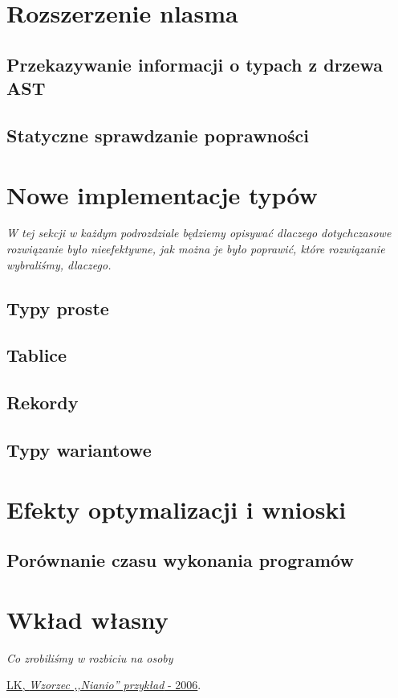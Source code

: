\documentclass[licencjacka]{pracamgr}
\begin{document}
\chapter{Rozszerzenie nlasma}
\section{Przekazywanie informacji o typach z drzewa AST}
\section{Statyczne sprawdzanie poprawności}

\chapter{Nowe implementacje typów}
  \emph{W tej sekcji w każdym podrozdziale będziemy opisywać dlaczego
    dotychczasowe rozwiązanie było nieefektywne, jak można je
    było poprawić, które rozwiązanie wybraliśmy, dlaczego.}
\section{Typy proste}
\section{Tablice}
\section{Rekordy}
\section{Typy wariantowe}

\chapter{Efekty optymalizacji i wnioski}
\section{Porównanie czasu wykonania programów}

\chapter{Wkład własny}
\emph{Co zrobiliśmy w rozbiciu na osoby}


\appendix

\begin{thebibliography}{99}

 \href{https://www.mimuw.edu.pl/~chrzaszc/BPJ20067/nianio.pdf}{LK, \textit{Wzorzec ,,Nianio'' przykład} - 2006}.

\end{thebibliography}
\end{document}
